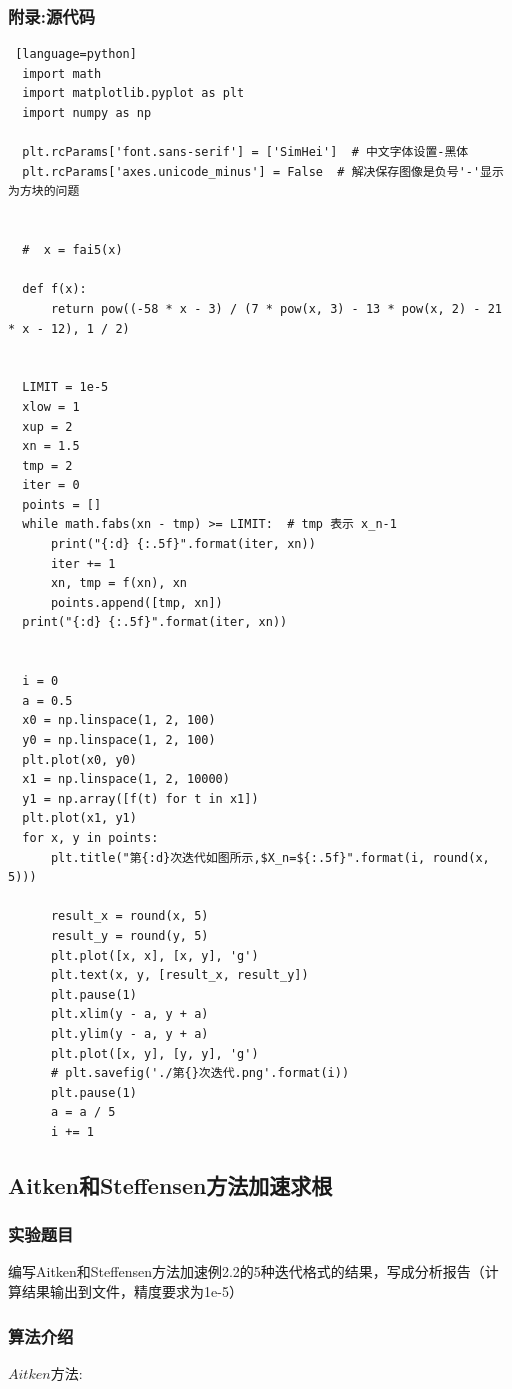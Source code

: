 \documentclass[UTF8]{ctexart}
\begin{document}
\subsubsection{附录:源代码}
\begin{lstlisting} [language=python]
  import math
  import matplotlib.pyplot as plt
  import numpy as np
  
  plt.rcParams['font.sans-serif'] = ['SimHei']  # 中文字体设置-黑体
  plt.rcParams['axes.unicode_minus'] = False  # 解决保存图像是负号'-'显示为方块的问题
  
  
  #  x = fai5(x)
  
  def f(x):
      return pow((-58 * x - 3) / (7 * pow(x, 3) - 13 * pow(x, 2) - 21 * x - 12), 1 / 2)
  
  
  LIMIT = 1e-5
  xlow = 1
  xup = 2
  xn = 1.5
  tmp = 2
  iter = 0
  points = []
  while math.fabs(xn - tmp) >= LIMIT:  # tmp 表示 x_n-1
      print("{:d} {:.5f}".format(iter, xn))
      iter += 1
      xn, tmp = f(xn), xn
      points.append([tmp, xn])
  print("{:d} {:.5f}".format(iter, xn))
  
  
  i = 0
  a = 0.5
  x0 = np.linspace(1, 2, 100)
  y0 = np.linspace(1, 2, 100)
  plt.plot(x0, y0)
  x1 = np.linspace(1, 2, 10000)
  y1 = np.array([f(t) for t in x1])
  plt.plot(x1, y1)
  for x, y in points:
      plt.title("第{:d}次迭代如图所示,$X_n=${:.5f}".format(i, round(x, 5)))
  
      result_x = round(x, 5)
      result_y = round(y, 5)
      plt.plot([x, x], [x, y], 'g')
      plt.text(x, y, [result_x, result_y])
      plt.pause(1)
      plt.xlim(y - a, y + a)
      plt.ylim(y - a, y + a)
      plt.plot([x, y], [y, y], 'g')
      # plt.savefig('./第{}次迭代.png'.format(i))
      plt.pause(1)
      a = a / 5
      i += 1
\end{lstlisting}

\subsection{Aitken和Steffensen方法加速求根}
\subsubsection{实验题目}
编写Aitken和Steffensen方法加速例2.2的5种迭代格式的结果，写成分析报告（计算结果输出到文件，精度要求为1e-5）
\subsubsection{算法介绍}
$Aitken$方法:
\end{document}
